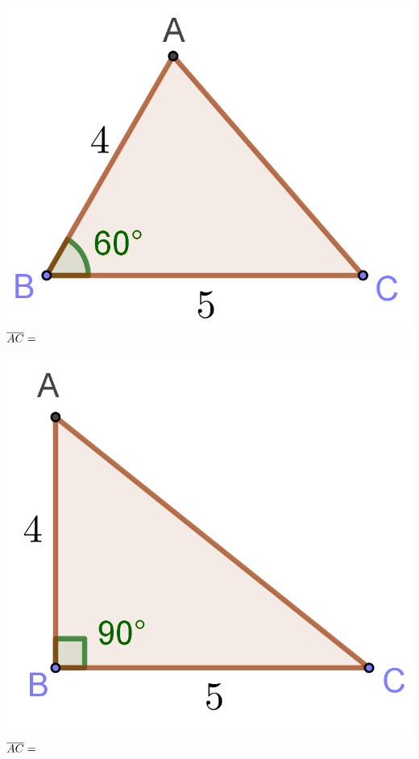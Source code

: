 \documentclass{oblivoir}
\begin{document}
%
\label{cos6}
\begin{minipage}{.24\textwidth}\centering
\includegraphics[width=\textwidth]{cos_6-1}
\\\(\overline{AC}=\)
\end{minipage}
\qquad
\begin{minipage}{.24\textwidth}\centering
\includegraphics[width=\textwidth]{cos_6-2}
\\\(\overline{AC}=\)
\end{minipage}
\end{document}

